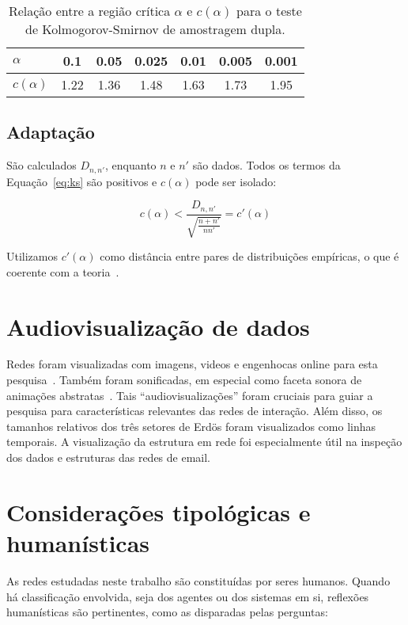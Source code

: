 \documentclass[a4paper,openright,12pt]{report} %
\begin{document}
\begin{table}[!h]
\centering
\caption{Relação entre a região crítica $\alpha$ e $c(\alpha)$ para o teste de Kolmogorov-Smirnov
de amostragem dupla.}\label{tab:kol}
\begin{tabular}{|l||c|c|c|c|c|c|}\hline
$\alpha$    & 0.1  & 0.05 & 0.025 & 0.01 & 0.005 & 0.001 \\\hline
$c(\alpha)$ & 1.22 & 1.36 & 1.48  & 1.63 & 1.73  & 1.95  \\\hline
\end{tabular}
\end{table}

\subsection{Adaptação}

São calculados $D_{n,n'}$, enquanto $n$ e $n'$ são dados.
Todos os termos da Equação~\ref{eq:ks} são positivos
e $c(\alpha)$ pode ser isolado:

\begin{equation}\label{eq:ks2}
c(\alpha) < \frac{D_{n,n'}}{\sqrt{\frac{n+n'}{nn'}}} = c'(\alpha)
\end{equation}

Utilizamos $c'(\alpha)$
como distância entre pares de distribuições empíricas,
o que é coerente com a teoria~\cite{kol}.

\section{Audiovisualização de dados}\label{sec:aud}
Redes foram visualizadas com imagens, videos e engenhocas online para esta pesquisa~\cite{animacoes,galGMANE,appGMANE}.
Também foram sonificadas, em especial como faceta sonora de animações abstratas~\cite{preludio,4hubs,gmane,social}.
Tais ``audiovisualizações'' foram cruciais para guiar a pesquisa para
características relevantes das redes de interação.
Além disso, os tamanhos relativos dos três setores de Erdös foram visualizados como linhas temporais.
A visualização da estrutura em rede foi especialmente útil na inspeção
dos dados e estruturas das redes de email.

\section{Considerações tipológicas e humanísticas}\label{sec:tip}
As redes estudadas neste trabalho são constituídas por seres humanos.
Quando há classificação envolvida, seja dos agentes
ou dos sistemas em si, reflexões humanísticas são pertinentes,
como as disparadas pelas perguntas:
\end{document}
